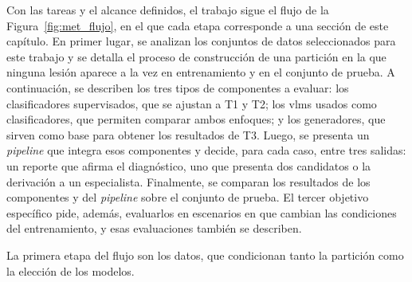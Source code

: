 Con las tareas y el alcance definidos, el trabajo sigue el flujo de la Figura~\ref{fig:met_flujo}, en el que cada
etapa corresponde a una sección de este capítulo. En primer lugar, se analizan los conjuntos de datos seleccionados para este trabajo y se detalla el proceso de
construcción de una partición en la que ninguna lesión aparece a la vez en entrenamiento y en el conjunto de prueba. A
continuación, se describen los tres tipos de componentes a evaluar: los clasificadores supervisados, que se ajustan a
T1 y T2; los \glspl{vlm} usados como clasificadores, que permiten comparar ambos enfoques; y los generadores, que
sirven como base para obtener los resultados de T3. Luego, se presenta un \emph{pipeline} que integra esos componentes
y decide, para cada caso, entre tres salidas: un reporte que afirma el diagnóstico, uno que presenta dos candidatos o
la derivación a un especialista. Finalmente, se comparan los resultados de los componentes y del \emph{pipeline} sobre
el conjunto de prueba. El tercer objetivo específico pide, además, evaluarlos en escenarios en que cambian las
condiciones del entrenamiento, y esas evaluaciones también se describen.



La primera etapa del flujo son los datos, que condicionan tanto la partición como la elección de los modelos.
